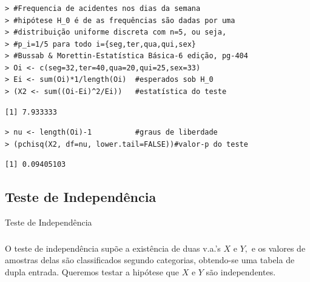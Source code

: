 \documentclass[14pt,aspectratio=1610]{beamer}
\begin{document}
\begin{frame}[fragile]{}
\frametitle{}
\begin{block}{}
\begin{verbatim}
> #Frequencia de acidentes nos dias da semana
> #hipótese H_0 é de as frequências são dadas por uma 
> #distribuição uniforme discreta com n=5, ou seja, 
> #p_i=1/5 para todo i={seg,ter,qua,qui,sex} 
> #Bussab & Morettin-Estatística Básica-6 edição, pg-404
> Oi <- c(seg=32,ter=40,qua=20,qui=25,sex=33)
> Ei <- sum(Oi)*1/length(Oi)  #esperados sob H_0
> (X2 <- sum((Oi-Ei)^2/Ei))   #estatística do teste
\end{verbatim}

\begin{verbatim}
[1] 7.933333
\end{verbatim}
\begin{verbatim}
> nu <- length(Oi)-1          #graus de liberdade
> (pchisq(X2, df=nu, lower.tail=FALSE))#valor-p do teste
\end{verbatim}

\begin{verbatim}
[1] 0.09405103
\end{verbatim}
\nocite{walmes}
\end{block}
\end{frame}

\subsection{Teste de Independência}
\begin{frame}{Teste de Independência}
\frametitle{}
\begin{block}{}
\justifying
O teste de independência supõe a existência de duas v.a.’s $X$ e $Y,$ e os valores de amostras delas são classificados segundo categorias, obtendo-se uma tabela de dupla entrada. Queremos testar a hipótese que $X$ e $Y$ são independentes.
\end{block}
\end{frame}
\end{document}
